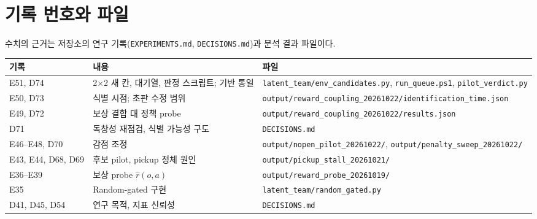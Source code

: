 \documentclass[11pt]{article}
\begin{document}
\appendix
\section{기록 번호와 파일}
수치의 근거는 저장소의 연구 기록(\texttt{EXPERIMENTS.md}, \texttt{DECISIONS.md})과 분석 결과 파일이다.
\begin{center}
\begin{tabularx}{\textwidth}{>{\raggedright\arraybackslash}p{2.3cm} L L}
\toprule
기록 & 내용 & 파일 \\
\midrule
E51, D74 & 2$\times$2 새 칸, 대기열, 판정 스크립트; 기반 통일 & \texttt{latent\_team/env\_candidates.py}, \texttt{run\_queue.ps1}, \texttt{pilot\_verdict.py} \\
E50, D73 & 식별 시점; 초판 수정 범위 & \texttt{output/reward\_coupling\_20261022/identification\_time.json} \\
E49, D72 & 보상 결합 대 정책 probe & \texttt{output/reward\_coupling\_20261022/results.json} \\
D71 & 독창성 재점검, 식별 가능성 구도 & \texttt{DECISIONS.md} \\
E46--E48, D70 & 감점 조정 & \texttt{output/nopen\_pilot\_20261022/}, \texttt{output/penalty\_sweep\_20261022/} \\
E43, E44, D68, D69 & 후보 pilot, pickup 정체 원인 & \texttt{output/pickup\_stall\_20261021/} \\
E36--E39 & 보상 probe $\hat r(o,a)$ & \texttt{output/reward\_probe\_20261019/} \\
E35 & Random-gated 구현 & \texttt{latent\_team/random\_gated.py} \\
D41, D45, D54 & 연구 목적, 지표 신뢰성 & \texttt{DECISIONS.md} \\
\bottomrule
\end{tabularx}
\end{center}
\end{document}
